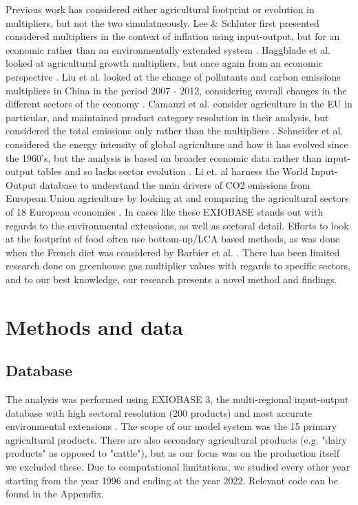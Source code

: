 \documentclass[a4paper,twoside]{article}
\begin{document}
Previous work has considered either agricultural footprint or evolution in multipliers, but not the two simulatneously. Lee & Schluter first presented considered multipliers in the context of inflation using input-output, but for an economic rather than an environmentally extended system \cite{Lee1977}. Haggblade et al. looked at agricultural growth multipliers, but once again from an economic perspective \cite{haggblade1991modeling}. Liu et al. looked at the change of pollutants and carbon emissions multipliers in China in the period 2007 - 2012, considering overall changes in the different sectors of the economy \cite{Liu2017}. Camanzi et al. consider agriculture in the EU in particular, and maintained product category resolution in their analysis, but considered the total emissions only rather than the multipliers \cite{Camanzi2017}. Schneider et al. considered the energy intensity of global agriculture and how it has evolved since the 1960's, but the analysis is based on broader economic data rather than input-output tables and so lacks sector evolution \cite{Schneider2009}. Li et. al harness the World Input-Output database to understand the main drivers of CO2 emissions from European Union agriculture by looking at and comparing the agricultural sectors of 18 European economies \cite{Li2016}. In cases like these EXIOBASE stands out with regards to the environmental extensions, as well as sectoral detail. Efforts to look at the footprint of food often use bottom-up/LCA based methods, as was done when the French diet was considered by Barbier et al. \cite{Barbier2019}. There has been limited research done on greenhouse gas multiplier values with regards to specific sectors, and to our best knowledge, our research presents a novel method and findings.

\section{Methods and data}

\subsection{Database}

The analysis was performed using EXIOBASE 3, the multi-regional input-output database with high sectoral resolution (200 products) and most accurate environmental extensions \cite{Stadler2018}. The scope of our model system was the 15 primary agricultural products. There are also secondary agricultural products (e.g. "dairy products" as opposed to "cattle"), but as our focus was on the production itself we excluded these. Due to computational limitations, we studied every other year starting from the year 1996 and ending at the year 2022. Relevant code can be found in the Appendix.
\end{document}
